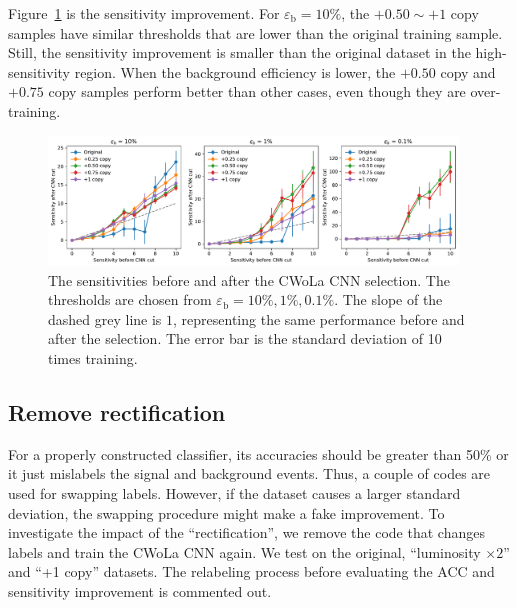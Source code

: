 \documentclass[12pt]{article}
\begin{document}
		Figure~\ref{fig:sensitivity_improvement_bkg_eff_copy_ratio} is the sensitivity improvement. For $\varepsilon_{\text{b}} = 10\%$, the $+ 0.50 \sim +1$ copy samples have similar thresholds that are lower than the original training sample. Still, the sensitivity improvement is smaller than the original dataset in the high-sensitivity region. When the background efficiency is lower, the $+ 0.50$ copy and $+ 0.75$ copy samples perform better than other cases, even though they are over-training. 
		\begin{figure}[htpb]
			\centering
			\includegraphics[width=0.97\textwidth]{HVmodel_sensitivity_improvement_bkg_eff_copy_ratio.pdf}
			\caption{The sensitivities before and after the CWoLa CNN selection. The thresholds are chosen from $\varepsilon_{\text{b}} = 10\%, 1\%, 0.1\%$. The slope of the dashed grey line is $1$, representing the same performance before and after the selection. The error bar is the standard deviation of 10 times training.}
			\label{fig:sensitivity_improvement_bkg_eff_copy_ratio}
		\end{figure}
	\subsection{Remove rectification}%
	\label{sub:remove_rectification}
		For a properly constructed classifier, its accuracies should be greater than 50\% or it just mislabels the signal and background events.	Thus, a couple of codes are used for swapping labels. However, if the dataset causes a larger standard deviation, the swapping procedure might make a fake improvement. To investigate the impact of the ``rectification'', we remove the code that changes labels and train the CWoLa CNN again. We test on the original, ``luminosity $\times 2$'' and ``+1 copy'' datasets. The relabeling process before evaluating the ACC and sensitivity improvement is commented out.
\end{document}
